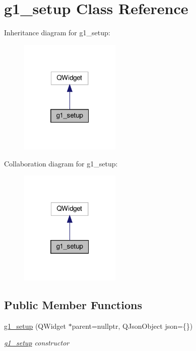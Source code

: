 \hypertarget{classg1__setup}{}\section{g1\+\_\+setup Class Reference}
\label{classg1__setup}


Inheritance diagram for g1\+\_\+setup\+:
\nopagebreak
\begin{figure}[H]
\begin{center}
\leavevmode
\includegraphics[width=136pt]{classg1__setup__inherit__graph}
\end{center}
\end{figure}


Collaboration diagram for g1\+\_\+setup\+:
\nopagebreak
\begin{figure}[H]
\begin{center}
\leavevmode
\includegraphics[width=136pt]{classg1__setup__coll__graph}
\end{center}
\end{figure}
\subsection*{Public Member Functions}
\begin{DoxyCompactItemize}
\item 
\hyperlink{classg1__setup_a3ccf5f574bca392284f9c3ae58612162}{g1\+\_\+setup} (Q\+Widget $\ast$parent=nullptr, Q\+Json\+Object json=\{\})
\begin{DoxyCompactList}\small\item\em \hyperlink{classg1__setup}{g1\+\_\+setup} constructor \end{DoxyCompactList}\end{DoxyCompactItemize}


